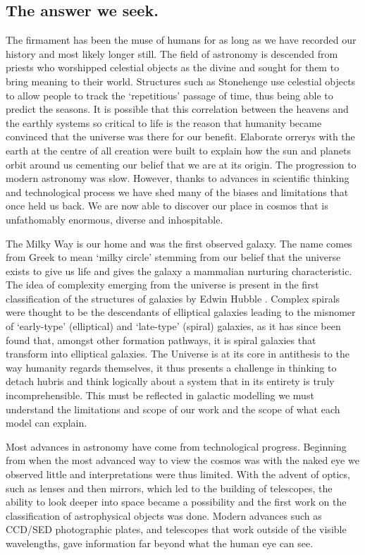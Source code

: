 \subsection{The answer we seek.}
The firmament has been the muse of humans for as long as we have recorded our history and most likely longer still. The field of astronomy is descended from priests who worshipped celestial objects as the divine and sought for them to bring meaning to their world. Structures such as Stonehenge use celestial objects to allow people to track the `repetitious' passage of time, thus being able to predict the seasons. It is possible that this correlation between the heavens and the earthly systems so critical to life is the reason that humanity became convinced that the universe was there for our benefit. Elaborate orrerys with the earth at the centre of all creation were built to explain how the sun and planets orbit around us cementing our belief that we are at its origin. 
The progression to modern astronomy was slow. However, thanks to advances in scientific thinking and technological process we have shed many of the biases and limitations that once held us back. We are now able to discover our place in cosmos that is unfathomably enormous, diverse and inhospitable. 

The Milky Way is our home and was the first observed galaxy. The name comes from Greek to mean `milky circle' stemming from our belief that the universe exists to give us life and gives the galaxy a mammalian nurturing characteristic. The idea of complexity emerging from the universe is present in the first classification of the structures of galaxies by Edwin Hubble \citep{Hubble1926Extra-galacticNebulae.,Hubble1927TheNebulae}.
Complex spirals were thought to be the descendants of elliptical galaxies leading to the misnomer of `early-type' (elliptical) and `late-type' (spiral) galaxies, as it has since been found that, amongst other formation pathways, it is spiral galaxies that transform into elliptical galaxies. The Universe is at its core in antithesis to the way humanity regards themselves, it thus presents a challenge in thinking to detach hubris and think logically about a system that in its entirety is truly incomprehensible. This must be reflected in galactic modelling we must understand the limitations and scope of our work and the scope of what each model can explain.

Most advances in astronomy have come from technological progress. Beginning from when the most advanced way to view the cosmos was with the naked eye we observed little and interpretations were thus limited. With the advent of optics, such as lenses and then mirrors, which led to the building of telescopes, the ability to look deeper into space became a possibility and the first work on the classification of astrophysical objects was done. Modern advances such as CCD/SED photographic plates, and telescopes that work outside of the visible wavelengths, gave information far beyond what the human eye can see. 


